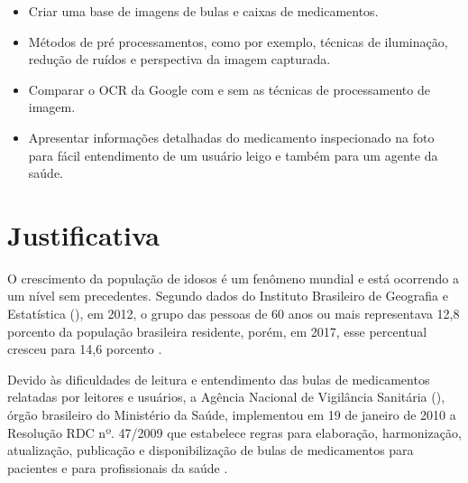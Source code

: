 \begin{itemize}
  \item Criar uma base de imagens de bulas e caixas de medicamentos.
  \item Métodos de pré processamentos, como por exemplo, técnicas de iluminação, redução de ruídos e perspectiva da imagem capturada.
  \item Comparar o OCR da Google com e sem as técnicas de processamento de imagem.
  \item Apresentar informações detalhadas do medicamento inspecionado na foto para fácil entendimento de um usuário leigo e também para um agente da saúde.
\end{itemize}



\section{Justificativa}
O crescimento da população de idosos é um fenômeno mundial e está ocorrendo a um nível sem precedentes. Segundo dados do Instituto Brasileiro de Geografia e Estatística (), em 2012, o grupo das pessoas de 60 anos ou mais representava 12,8 porcento da população brasileira residente, porém, em 2017, esse percentual cresceu para 14,6 porcento \cite{jornaldocomercio1}.


Devido às dificuldades de leitura e entendimento das bulas de medicamentos relatadas por leitores e usuários, a Agência Nacional de Vigilância Sanitária (), órgão brasileiro do Ministério da Saúde, implementou em 19 de janeiro de 2010 a Resolução RDC nº. 47/2009 que estabelece regras para elaboração, harmonização, atualização, publicação e disponibilização de bulas de medicamentos para pacientes e para profissionais da saúde \cite{PORTALANVISA2019}.








